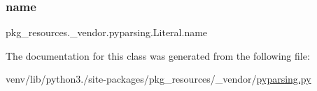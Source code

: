 \subsubsection{\texorpdfstring{name}{name}}
{\footnotesize\ttfamily pkg\+\_\+resources.\+\_\+vendor.\+pyparsing.\+Literal.\+name}



The documentation for this class was generated from the following file\+:\begin{DoxyCompactItemize}
\item 
venv/lib/python3./site-\/packages/pkg\+\_\+resources/\+\_\+vendor/\hyperlink{pkg__resources_2__vendor_2pyparsing_8py}{pyparsing.\+py}\end{DoxyCompactItemize}
